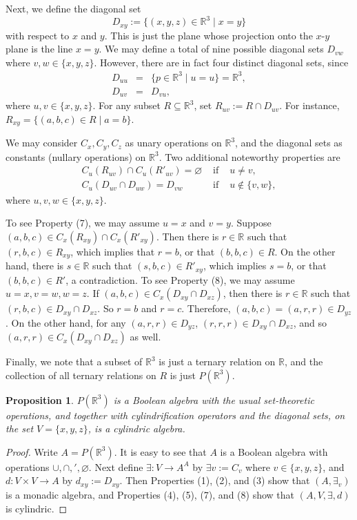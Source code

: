 \documentclass[12pt]{article}
\newtheorem{prop}{Proposition}
\begin{document}
Next, we define the diagonal set $$D_{xy}:=\lbrace (x,y,z)\in \mathbb{R}^3\mid x=y\rbrace$$ with respect to $x$ and $y$.  This is just the plane whose projection onto the $x$-$y$ plane is the line $x=y$.  We may define a total of nine possible diagonal sets $D_{vw}$ where $v,w\in \lbrace x,y,z\rbrace$.  However, there are in fact four distinct diagonal sets, since
\begin{eqnarray}
D_{uu}&=&\lbrace p\in \mathbb{R}^3\mid u=u\rbrace = \mathbb{R}^3, \\
D_{uv}&=&D_{vu},
\end{eqnarray}
where $u,v\in \lbrace x,y,z\rbrace$.  For any subset $R\subseteq \mathbb{R}^3$, set $R_{uv}:=R\cap D_{uv}$.  For instance, $R_{xy}=\lbrace (a,b,c)\in R\mid a=b\rbrace$.

We may consider $C_x,C_y,C_z$ as unary operations on $\mathbb{R}^3$, and the diagonal sets as constants (nullary operations) on $\mathbb{R}^3$.  Two additional noteworthy properties are
\begin{eqnarray}
C_u(R_{uv})\cap C_u(R'_{uv})=\varnothing&\mbox{ if }&u\ne v, \\
C_u(D_{uv}\cap D_{uw})=D_{vw}&\mbox{ if }&u\notin \lbrace v,w\rbrace,
\end{eqnarray}
where $u,v,w\in \lbrace x,y,z\rbrace$.

To see Property (7), we may assume $u=x$ and $v=y$.  Suppose $(a,b,c)\in C_x(R_{xy})\cap C_x(R'_{xy})$.  Then there is $r\in \mathbb{R}$ such that $(r,b,c)\in R_{xy}$, which implies that $r=b$, or that $(b,b,c)\in R$.  On the other hand, there is $s\in \mathbb{R}$ such that $(s,b,c)\in R'_{xy}$, which implies $s=b$, or that $(b,b,c)\in R'$, a contradiction.  To see Property (8), we may assume $u=x,v=w,w=z$.  If $(a,b,c)\in C_x(D_{xy}\cap D_{xz})$, then there is $r\in \mathbb{R}$ such that $(r,b,c)\in D_{xy}\cap D_{xz}$.  So $r=b$ and $r=c$.  Therefore, $(a,b,c)=(a,r,r)\in D_{yz}$.  On the other hand, for any $(a,r,r)\in D_{yz}$, $(r,r,r)\in D_{xy}\cap D_{xz}$, and so $(a,r,r)\in C_x(D_{xy}\cap D_{xz})$ as well.

Finally, we note that a subset of $\mathbb{R}^3$ is just a ternary relation on $\mathbb{R}$, and the collection of all ternary relations on $R$ is just $P(\mathbb{R}^3)$.

\begin{prop}  $P(\mathbb{R}^3)$ is a Boolean algebra with the usual set-theoretic operations, and together with cylindrification operators and the diagonal sets, on the set $V=\lbrace x,y,z\rbrace$, is a cylindric algebra.
\end{prop}
\begin{proof}
Write $A=P(\mathbb{R}^3)$.  It is easy to see that $A$ is a Boolean algebra with operations $\cup,\cap,',\varnothing$.  Next define $\exists: V\to A^A$ by $\exists v:=C_v$ where $v\in \lbrace x,y,z\rbrace$, and $d:V\times V\to A$ by $d_{xy}:=D_{xy}$.  Then Properties (1), (2), and (3) show that $(A,\exists_v)$ is a monadic algebra, and Properties (4), (5), (7), and (8) show that $(A,V,\exists,d)$ is cylindric.
\end{proof}
\end{document}
